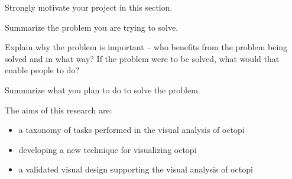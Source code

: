 
Strongly motivate your project in this section.

Summarize the problem you are trying to solve.

Explain why the problem is important -- who benefits from the problem being
solved and in what way? If the problem were to be solved, what would that
enable people to do?

Summarize what you plan to do to solve the problem.

The aims of this research are:
\begin{itemize}
  \item a taxonomy of tasks performed in the visual analysis of octopi 
  \item developing a new technique for visualizing octopi
  \item a validated visual design supporting the visual analysis of octopi
\end{itemize}


